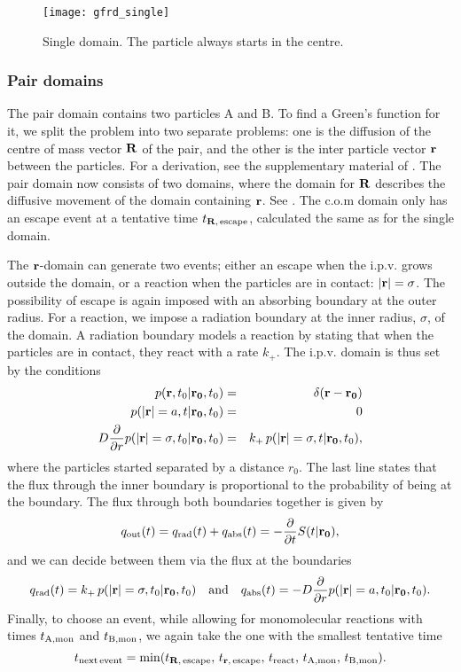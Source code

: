 \begin{figure}[ht]
\centering
\texttt{[image: gfrd\_single]}
\caption{ Single domain. The particle always starts in the centre.}
\end{figure}


\subsubsection{Pair domains}
The pair domain contains two particles A and B. To find a Green's function for it, we split the problem into two separate problems: one is the diffusion of the centre of mass vector ${\bf R}$ of the pair, and the other is the inter particle vector ${\bf r}$ between the particles. For a derivation, see the supplementary material of \cite{Takahashi2010}. The pair domain now consists of two domains, where the domain for ${\bf R}$ describes the diffusive movement of the domain containing ${\bf r}$. See . The c.o.m domain only has an escape event at a tentative time $t_{{\bf R},\,{\rm escape}}$, calculated the same as for the single domain. 

The ${\bf r}$-domain can generate two events; either an escape when the i.p.v. grows outside the domain, or a reaction when the particles are in contact: ${\bf |r|}=\sigma$. The possibility of escape is again imposed with an absorbing boundary at the outer radius. For a reaction, we impose a radiation boundary at the inner radius, $\sigma$, of the domain. A radiation boundary models a reaction by stating that when the particles are in contact, they react with a rate $k_+$. The i.p.v. domain is thus set by the conditions
\setlength{\jot}{10pt}
\begin{eqnarray}
 p({\bf r}, t_0|{\bf r_0},t_0) & = & \delta(\mathbf{r - r_0}) \\
 p({\bf |r|}=a, t|{\bf r_0},t_0) & = & 0 \\
 D \frac{\partial }{\partial r} p({\bf |r|}=\sigma, t_0|{\bf r_0},t_0) & = & k_+\,p({\bf |r|}=\sigma, t|{\bf r_0},t_0),
\end{eqnarray}
where the particles started separated by a distance $r_0$. The last line states that the flux through the inner boundary is proportional to the probability of being at the boundary. The flux through both boundaries together is given by
\begin{equation}
 q_{\rm out}(t) = q_{\rm rad}(t) + q_{\rm abs}(t) = -\frac{\partial }{\partial t} S(t|{\bf r_0}),
\end{equation}
and we can decide between them via the flux at the boundaries
\begin{equation}
q_{\rm rad}(t) = k_+ \, p({\bf |r|}=\sigma, t_0|{\bf r_0},t_0) \quad{\rm and}\quad q_{\rm abs}(t) = - D \frac{\partial }{\partial r} p({\bf |r|}=a, t_0|{\bf r_0},t_0).
\end{equation}
Finally, to choose an event, while allowing for monomolecular reactions with times $t_{\rm A, mon}$ and $t_{\rm B, mon}$, we again take the one with the smallest tentative time
\begin{equation}
 t_{\rm next\,event} = {\rm min}(t_{{\bf R},\,{\rm escape}},\,t_{{\bf r},\,{\rm escape}},\,t_{\rm react},\,t_{\rm A, mon},\,t_{\rm B, mon}).
\end{equation}

